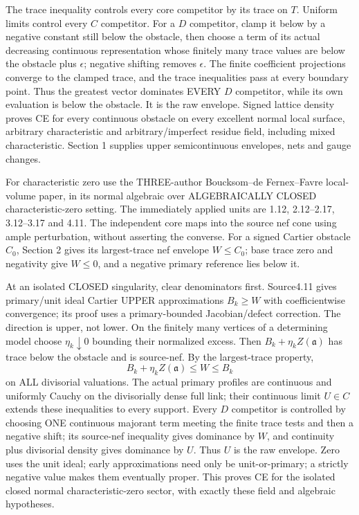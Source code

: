\documentclass[11pt]{article}
\begin{document}
The trace inequality controls every core competitor by its trace on \(T\). Uniform limits control every \(C\) competitor. For a \(D\) competitor, clamp it below by a negative constant still below the obstacle, then choose a term of its actual decreasing continuous representation whose finitely many trace values are below the obstacle plus \(\epsilon\); negative shifting removes \(\epsilon\). The finite coefficient projections converge to the clamped trace, and the trace inequalities pass at every boundary point. Thus the greatest vector dominates EVERY \(D\) competitor, while its own evaluation is below the obstacle. It is the raw envelope. Signed lattice density proves CE for every continuous obstacle on every excellent normal local surface, arbitrary characteristic and arbitrary/imperfect residue field, including mixed characteristic. Section 1 supplies upper semicontinuous envelopes, nets and gauge changes.

For characteristic zero use the THREE-author Boucksom--de Fernex--Favre local-volume paper, in its normal algebraic over ALGEBRAICALLY CLOSED characteristic-zero setting. The immediately applied units are 1.12, 2.12--2.17, 3.12--3.17 and 4.11. The independent core maps into the source nef cone using ample perturbation, without asserting the converse. For a signed Cartier obstacle \(C_0\), Section 2 gives its largest-trace nef envelope \(W\le C_0\); base trace zero and negativity give \(W\le0\), and a negative primary reference lies below it.

At an isolated CLOSED singularity, clear denominators first. Source4.11 gives primary/unit ideal Cartier UPPER approximations \(B_k\ge W\) with coefficientwise convergence; its proof uses a primary-bounded Jacobian/defect correction. The direction is upper, not lower. On the finitely many vertices of a determining model choose \(\eta_k\downarrow0\) bounding their normalized excess. Then \(B_k+\eta_k Z(\mathfrak a)\) has trace below the obstacle and is source-nef. By the largest-trace property,
\[
B_k+\eta_k Z(\mathfrak a)\le W\le B_k
\]
on ALL divisorial valuations. The actual primary profiles are continuous and uniformly Cauchy on the divisorially dense full link; their continuous limit \(U\in C\) extends these inequalities to every support. Every \(D\) competitor is controlled by choosing ONE continuous majorant term meeting the finite trace tests and then a negative shift; its source-nef inequality gives dominance by \(W\), and continuity plus divisorial density gives dominance by \(U\). Thus \(U\) is the raw envelope. Zero uses the unit ideal; early approximations need only be unit-or-primary; a strictly negative value makes them eventually proper. This proves CE for the isolated closed normal characteristic-zero sector, with exactly these field and algebraic hypotheses.
\end{document}
